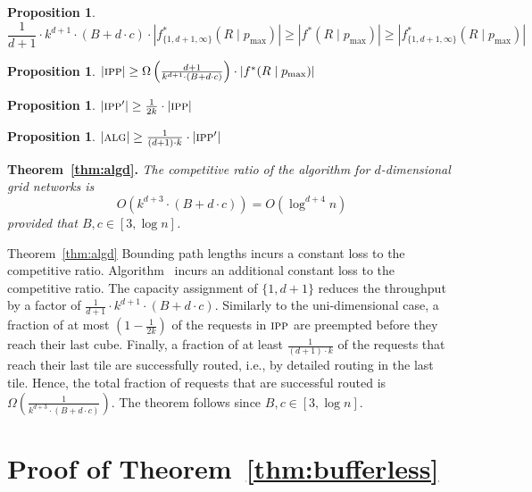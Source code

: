 \documentclass[11pt]{article}
\newtheorem{proposition}[theorem]{Proposition}
\newcommand{\route}{\text{\sc{ipp}}}
\newcommand{\IPP}{\route}
\newcommand{\pmax}{p_{\max}}
\newcommand{\alg}{\text{\sc{alg}}}
\newenvironment{proof sketch}[1]{\noindent {\emph{Proof sketch of #1:}}}{\hfill \qed}
\begin{document}
\begin{proposition}\label{prop:scaledd}
    $$\frac{1}{d+1}\cdot k^{d+1}\cdot (B+d\cdot c)\cdot |f^*_{\{1,d+1,\infty\}}(R \mid \pmax)| \geq |f^*(R \mid \pmax)| \geq |f^*_{\{1,d+1,\infty\}}(R \mid \pmax)|$$
\end{proposition}

\begin{proposition}\label{prop:fippd}
    $|\IPP| \geq \Omega \left(\frac{d+1}{k^{d+1}\cdot(B+d\cdot c)}\right) \cdot |f^*(R \mid \pmax)|$
\end{proposition}

\begin{proposition}\label{prop:preemptionsd}
    $|\IPP'| \geq \frac{1}{2k} \cdot |\IPP|$
\end{proposition}

\begin{proposition}\label{prop:lastd}\label{prop:Rsd}
    $|\alg| \geq \frac{1}{(d+1)\cdot k} \cdot |\IPP'|$
\end{proposition}

\noindent \textbf{Theorem~\ref{thm:algd}.} \emph{The competitive ratio of the
algorithm for $d$-dimensional grid networks is $$O\left(k^{d+3}
\cdot(B+d\cdot c) \right)=O\left(\log^{d+4} n \right)$$ provided that
$B,c \in [3,\log n]$.}
\medskip

\begin{proof sketch}{Theorem~\ref{thm:algd}}
    Bounding path lengths incurs a constant loss to the competitive
    ratio. Algorithm \IPP\ incurs an additional constant loss to the
    competitive ratio. The capacity assignment of $\{1,d+1\}$ reduces
    the throughput by a factor of $\frac{1}{d+1}\cdot k^{d+1} \cdot
    (B+d\cdot c)$.
    Similarly to the uni-dimensional case, a fraction of at most $(1-\frac{1}{2k})$ of the requests in $\IPP$ are preempted before they reach their last cube.
    Finally, a fraction of at least $\frac{1}{(d+1)\cdot k}$ of the requests that reach their last tile are successfully routed, i.e.,  by detailed routing in the last tile.
    Hence, the total fraction of requests that are successful routed is $\Omega \left(\frac{1}{k^{d+3}\cdot(B+d\cdot c)}\right)$.
    The theorem follows since $B,c \in [3,\log
    n]$.
\end{proof sketch}


\section{Proof of Theorem~\ref{thm:bufferless}}\label{sec:proofs}
\end{document}
